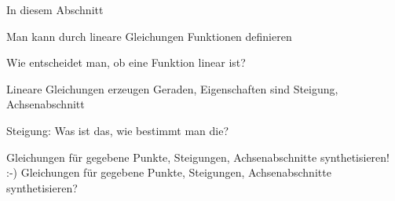 \documentclass[../../main.tex]{subfiles}
\begin{document}
In diesem Abschnitt 

Man kann durch lineare Gleichungen Funktionen definieren

Wie entscheidet man, ob eine Funktion linear ist?

Lineare Gleichungen erzeugen Geraden, Eigenschaften sind Steigung, Achsenabschnitt

Steigung: Was ist das, wie bestimmt man die?

Gleichungen für gegebene Punkte, Steigungen, Achsenabschnitte synthetisieren! :-)
Gleichungen für gegebene Punkte, Steigungen, Achsenabschnitte synthetisieren?
\end{document}
